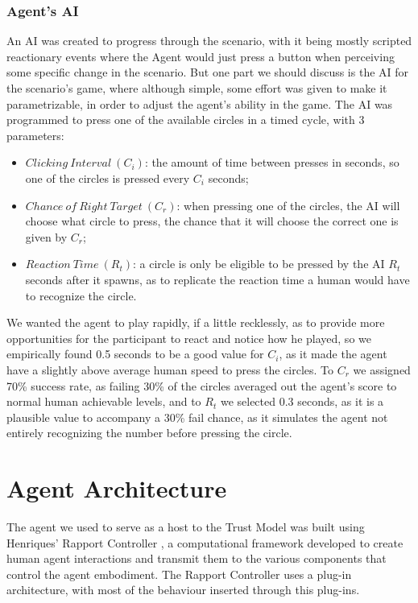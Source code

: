 \subsubsection{Agent's \ac{AI}}
An \ac{AI} was created to progress through the scenario, with it being mostly scripted reactionary events where the Agent would just press a button when perceiving some specific change in the scenario. But one part we should discuss is the \ac{AI} for the scenario's game, where although simple, some effort was given to make it parametrizable, in order to adjust the agent's ability in the game. The \ac{AI} was programmed to press one of the available circles in a timed cycle, with 3 parameters:
\begin{itemize}
    \item $Clicking\ Interval\ (C_i)$: the amount of time between presses in seconds, so one of the circles is pressed every $C_i$ seconds;
    \item $Chance\ of\ Right\ Target\ (C_r)$: when pressing one of the circles, the \ac{AI} will choose what circle to press, the chance that it will choose the correct one is given by $C_r$;
    \item $Reaction\ Time\ (R_t)$: a circle is only be eligible to be pressed by the \ac{AI} $R_t$ seconds after it spawns, as to replicate the reaction time a human would have to recognize the circle.
\end{itemize} 
We wanted the agent to play rapidly, if a little recklessly, as to provide more opportunities for the participant to react and notice how he played, so we empirically found 0.5 seconds to be a good value for $C_i$, as it made the agent have a slightly above average human speed to press the circles. To $C_r$ we assigned 70\% success rate, as failing 30\% of the circles averaged out the agent's score to normal human achievable levels, and to $R_t$ we selected 0.3 seconds, as it is a plausible value to accompany a 30\% fail chance, as it simulates the agent not entirely recognizing the number before pressing the circle.

\section{Agent Architecture}
The agent we used to serve as a host to the Trust Model was built using Henriques' Rapport Controller \cite{Henriques2016}, a computational framework developed to create human agent interactions and transmit them to the various components that control the agent embodiment. The Rapport Controller uses a plug-in architecture, with most of the behaviour inserted through this plug-ins.



